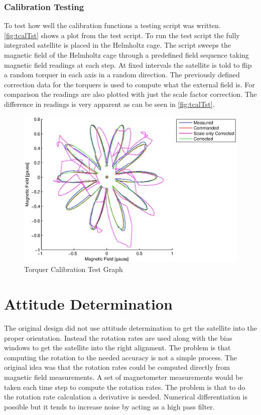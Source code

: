 \subsubsection{Calibration Testing}

To test how well the calibration functions a testing script was written. \autoref{fig:tcalTst} shows a plot from the test script. To run the test script the fully integrated satellite is placed in the Helmholtz cage. The script sweeps the magnetic field of the Helmholtz cage through a predefined field sequence taking magnetic field readings at each step. At fixed intervals the satellite is told to flip a random torquer in each axis in a random direction. The previously defined correction data for the torquers is used to compute what the external field is. For comparison the readings are also plotted with just the scale factor correction. The difference in readings is very apparent as can be seen in \autoref{fig:tcalTst}.


\begin{figure}[H]
    \centering
    \includegraphics[width=\textwidth]{Figures/torqueCalTst}
    \caption{Torquer Calibration Test Graph}
    \label{fig:tcalTst}
\end{figure}

\section{Attitude Determination}

The original design did not use attitude determination to get the satellite into the proper orientation. Instead the rotation rates are used along with the bias windows to get the satellite into the right alignment. The problem is that computing the rotation to the needed accuracy is not a simple process. The original idea was that the rotation rates could be computed directly from magnetic field measurements. A set of magnetometer measurements would be taken each time step to compute the rotation rates. The problem is that to do the rotation rate calculation a derivative is needed. Numerical differentiation is possible but it tends to increase noise by acting as a high pass filter.

